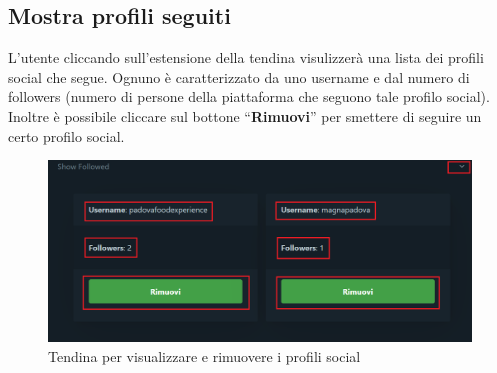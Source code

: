 {    \subsection{Mostra profili seguiti} {
        L'utente cliccando sull'estensione della tendina visulizzerà una lista dei profili social che segue. 
        Ognuno è caratterizzato da uno username e dal numero di followers (numero di persone della piattaforma \platform{} che seguono tale profilo social). 
        Inoltre è possibile cliccare sul bottone ``\textbf{Rimuovi}'' per smettere di seguire un certo profilo social. 
        \begin{figure}[H]
            \includegraphics[width=14cm]{sezioni/images/tendina-account.png}
            \centering
            \caption{Tendina per visualizzare e rimuovere i profili social}
        \end{figure}
    }

}
